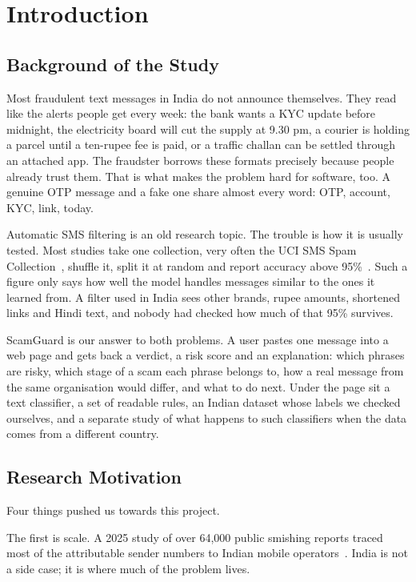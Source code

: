 \chapter{Introduction}

\section{Background of the Study}
Most fraudulent text messages in India do not announce themselves. They read like the alerts people get every week: the bank wants a KYC update before midnight, the electricity board will cut the supply at 9.30 pm, a courier is holding a parcel until a ten-rupee fee is paid, or a traffic challan can be settled through an attached app. The fraudster borrows these formats precisely because people already trust them. That is what makes the problem hard for software, too. A genuine OTP message and a fake one share almost every word: OTP, account, KYC, link, today.

Automatic SMS filtering is an old research topic. The trouble is how it is usually tested. Most studies take one collection, very often the UCI SMS Spam Collection~\cite{almeida2011contributions}, shuffle it, split it at random and report accuracy above 95\%~\cite{almeida2013towards,roy2020deep}. Such a figure only says how well the model handles messages similar to the ones it learned from. A filter used in India sees other brands, rupee amounts, shortened links and Hindi text, and nobody had checked how much of that 95\% survives.

ScamGuard is our answer to both problems. A user pastes one message into a web page and gets back a verdict, a risk score and an explanation: which phrases are risky, which stage of a scam each phrase belongs to, how a real message from the same organisation would differ, and what to do next. Under the page sit a text classifier, a set of readable rules, an Indian dataset whose labels we checked ourselves, and a separate study of what happens to such classifiers when the data comes from a different country.

\section{Research Motivation}
Four things pushed us towards this project.

The first is scale. A 2025 study of over 64,000 public smishing reports traced most of the attributable sender numbers to Indian mobile operators~\cite{agarwal2025fishing}. India is not a side case; it is where much of the problem lives.

